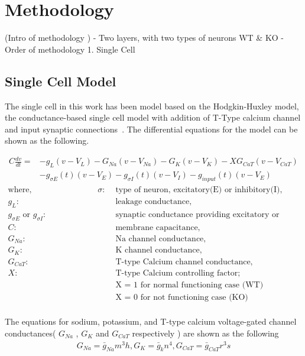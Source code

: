 \chapter{Methodology}

(Intro of methodology )
- Two layers, with two types of neurons  WT \& KO 
- Order of methodology 
1. Single Cell  

\section{Single Cell Model}

The single cell in this work has been model based on the Hodgkin-Huxley model, the conductance-based single cell model with addition of T-Type calcium channel and input synaptic connections~\cite{hodgkin1952quantitative, wang1991model, paik2009spontaneous}. The differential equations for the model can be shown as the following.

\begin{align*}
C\frac{dv}{dt} = &-g_L(v - V_L) - G_{Na}(v - V_{Na}) - G_K(v - V_K) - XG_{CaT}(v - V_{CaT}) \\
&- g_{\sigma E}(t)(v - V_E) - g_{\sigma I}(t)(v - V_I) - g_{input}(t)(v - V_E)
\end{align*}
\begin{align*}
	\text{where,} \hspace{8em} \sigma :& \text{ type of neuron, excitatory(E) or inhibitory(I),}  \\
	g_L :& \text{ leakage conductance,} \\
	g_{\sigma E} \text{ or } g_{\sigma I} :& \text{ synaptic conductance providing excitatory or inhibitory input} \\
	C :& \text{ membrane capacitance,}\\
	G_{Na} :& \text{ Na channel conductance,}\\
	G_{K} :& \text{ K channel conductance,}\\
	G_{CaT} :& \text{ T-type Calcium channel conductance,}\\
	X :& \text{ T-type Calcium controlling factor;}\\
	   &  \text{ X = 1 for normal functioning case (WT) }\\
	   &  \text{ X = 0 for not functioning case (KO) }\\
\end{align*}

The equations for sodium, potassium, and T-type calcium voltage-gated channel conductances( $G_{Na}$ , $G_{K}$ and $G_{CaT}$ respectively ) are shown as the following
\begin{align*} 
G_{Na} = \bar{g}_{Na}m^{3}h , G_{K} = \bar{g}_{k}n^{4}, G_{CaT} = \bar{g}_{CaT} r^{3}s\\
\end{align*}

